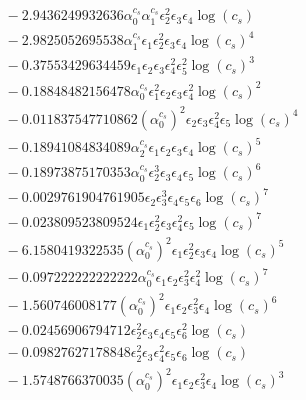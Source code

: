 \documentclass[10pt]{article}
\begin{document}
\begin{align*}
&{}  - 2.9436249932636 \alpha_{0}^{c_s} \alpha_{1}^{c_s} \epsilon_{2}^{2} \epsilon_{3} \epsilon_{4} \log{\left(c_{s} \right)} \\
&{}  - 2.9825052695538 \alpha_{1}^{c_s} \epsilon_{1} \epsilon_{2}^{2} \epsilon_{3} \epsilon_{4} \log{\left(c_{s} \right)}^{4} \\
&{}  - 0.37553429634459 \epsilon_{1} \epsilon_{2} \epsilon_{3} \epsilon_{4}^{2} \epsilon_{5}^{2} \log{\left(c_{s} \right)}^{3} \\
&{}  - 0.18848482156478 \alpha_{0}^{c_s} \epsilon_{1}^{2} \epsilon_{2} \epsilon_{3} \epsilon_{4}^{2} \log{\left(c_{s} \right)}^{2} \\
&{}  - 0.011837547710862 \left(\alpha_{0}^{c_s}\right)^{2} \epsilon_{2} \epsilon_{3} \epsilon_{4}^{2} \epsilon_{5} \log{\left(c_{s} \right)}^{4} \\
&{}  - 0.18941084834089 \alpha_{2}^{c_s} \epsilon_{1} \epsilon_{2} \epsilon_{3} \epsilon_{4} \log{\left(c_{s} \right)}^{5} \\
&{}  - 0.18973875170353 \alpha_{0}^{c_s} \epsilon_{2}^{3} \epsilon_{3} \epsilon_{4} \epsilon_{5} \log{\left(c_{s} \right)}^{6} \\
&{}  - 0.0029761904761905 \epsilon_{2} \epsilon_{3}^{3} \epsilon_{4} \epsilon_{5} \epsilon_{6} \log{\left(c_{s} \right)}^{7} \\
&{}  - 0.023809523809524 \epsilon_{1} \epsilon_{2}^{2} \epsilon_{3} \epsilon_{4}^{2} \epsilon_{5} \log{\left(c_{s} \right)}^{7} \\
&{}  - 6.1580419322535 \left(\alpha_{0}^{c_s}\right)^{2} \epsilon_{1} \epsilon_{2}^{2} \epsilon_{3} \epsilon_{4} \log{\left(c_{s} \right)}^{5} \\
&{}  - 0.097222222222222 \alpha_{0}^{c_s} \epsilon_{1} \epsilon_{2} \epsilon_{3}^{2} \epsilon_{4}^{2} \log{\left(c_{s} \right)}^{7} \\
&{}  - 1.560746008177 \left(\alpha_{0}^{c_s}\right)^{2} \epsilon_{1} \epsilon_{2} \epsilon_{3}^{2} \epsilon_{4} \log{\left(c_{s} \right)}^{6} \\
&{}  - 0.02456906794712 \epsilon_{2}^{2} \epsilon_{3} \epsilon_{4} \epsilon_{5} \epsilon_{6}^{2} \log{\left(c_{s} \right)} \\
&{}  - 0.09827627178848 \epsilon_{2}^{2} \epsilon_{3} \epsilon_{4}^{2} \epsilon_{5} \epsilon_{6} \log{\left(c_{s} \right)} \\
&{}  - 1.5748766370035 \left(\alpha_{0}^{c_s}\right)^{2} \epsilon_{1} \epsilon_{2} \epsilon_{3}^{2} \epsilon_{4} \log{\left(c_{s} \right)}^{3} \\

\end{align*}
\end{document}
